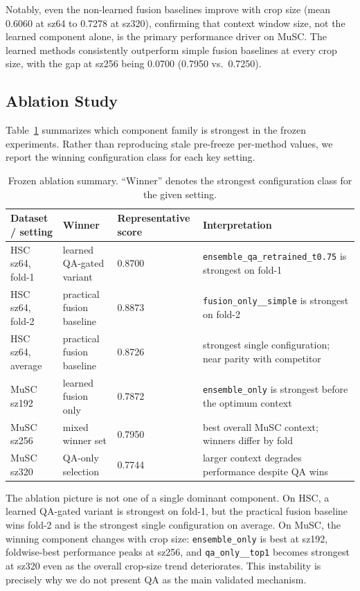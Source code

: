 Notably, even the non-learned fusion baselines improve with crop size (mean 0.6060 at sz64 to
0.7278 at sz320), confirming that context window size, not the learned component alone, is the
primary performance driver on MuSC. The learned methods consistently outperform simple fusion
baselines at every crop size, with the gap at sz256 being 0.0700 (0.7950 vs.\ 0.7250).

\subsection{Ablation Study}
\label{sec:ablation}

Table~\ref{tab:ablation} summarizes which component family is strongest in the frozen experiments.
Rather than reproducing stale pre-freeze per-method values, we report the winning configuration
class for each key setting.

\begin{table}[ht]
\centering
\caption{Frozen ablation summary. ``Winner'' denotes the strongest configuration class for the given setting.}
\label{tab:ablation}
\begin{tabular}{llll}
\hline
\textbf{Dataset / setting} & \textbf{Winner} & \textbf{Representative score} & \textbf{Interpretation} \\
\hline
HSC sz64, fold-1 & learned QA-gated variant & 0.8700 & \texttt{ensemble\_qa\_retrained\_t0.75} is strongest on fold-1 \\
HSC sz64, fold-2 & practical fusion baseline & 0.8873 & \texttt{fusion\_only\_\_simple} is strongest on fold-2 \\
HSC sz64, average & practical fusion baseline & 0.8726 & strongest single configuration; near parity with competitor \\
MuSC sz192 & learned fusion only & 0.7872 & \texttt{ensemble\_only} is strongest before the optimum context \\
MuSC sz256 & mixed winner set & 0.7950 & best overall MuSC context; winners differ by fold \\
MuSC sz320 & QA-only selection & 0.7744 & larger context degrades performance despite QA wins \\
\hline
\end{tabular}
\end{table}

The ablation picture is not one of a single dominant component. On HSC, a learned QA-gated variant
is strongest on fold-1, but the practical fusion baseline wins fold-2 and is the strongest single
configuration on average. On MuSC, the winning component changes with crop size:
\texttt{ensemble\_only} is best at sz192, foldwise-best performance peaks at sz256, and
\texttt{qa\_only\_\_top1} becomes strongest at sz320 even as the overall crop-size trend
deteriorates. This instability is precisely why we do not present QA as the main validated
mechanism.

